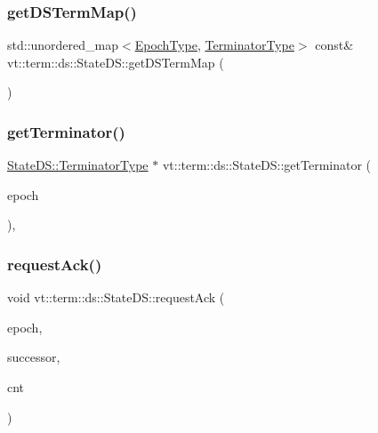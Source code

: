 \subsubsection{\texorpdfstring{get\+D\+S\+Term\+Map()}{getDSTermMap()}}
{\footnotesize\ttfamily std\+::unordered\+\_\+map$<$\hyperlink{namespacevt_a81d11b28122d43bf9834577e4a06440f}{Epoch\+Type}, \hyperlink{structvt_1_1term_1_1ds_1_1_state_d_s_af98cfe31c25f710273ee103026d538e4}{Terminator\+Type}$>$ const\& vt\+::term\+::ds\+::\+State\+D\+S\+::get\+D\+S\+Term\+Map (\begin{DoxyParamCaption}{ }\end{DoxyParamCaption})\hspace{0.3cm}{\ttfamily [inline]}}

\mbox{\label{structvt_1_1term_1_1ds_1_1_state_d_s_a291452cba8050d7a5e377b1e86c3f42a}} 
\subsubsection{\texorpdfstring{get\+Terminator()}{getTerminator()}}
{\footnotesize\ttfamily \hyperlink{structvt_1_1term_1_1ds_1_1_state_d_s_af98cfe31c25f710273ee103026d538e4}{State\+D\+S\+::\+Terminator\+Type} $\ast$ vt\+::term\+::ds\+::\+State\+D\+S\+::get\+Terminator (\begin{DoxyParamCaption}\item[{\hyperlink{namespacevt_a81d11b28122d43bf9834577e4a06440f}{Epoch\+Type} const \&}]{epoch }\end{DoxyParamCaption})\hspace{0.3cm}{\ttfamily [static]}, {\ttfamily [private]}}

\mbox{\label{structvt_1_1term_1_1ds_1_1_state_d_s_acdf0151492a1e35c6565c65b138e8ac9}} 
\subsubsection{\texorpdfstring{request\+Ack()}{requestAck()}}
{\footnotesize\ttfamily void vt\+::term\+::ds\+::\+State\+D\+S\+::request\+Ack (\begin{DoxyParamCaption}\item[{\hyperlink{namespacevt_a81d11b28122d43bf9834577e4a06440f}{Epoch\+Type}}]{epoch,  }\item[{\hyperlink{structvt_1_1term_1_1ds_1_1_state_d_s_aba302de614dd639f5d93f4f5b6dd6108}{Endpoint}}]{successor,  }\item[{int64\+\_\+t}]{cnt }\end{DoxyParamCaption})\hspace{0.3cm}{\ttfamily [static]}}

